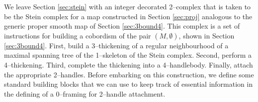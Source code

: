 We leave Section \ref{sec:stein} with an integer decorated 2--complex that is taken to be the Stein complex for a map constructed in Section \ref{sec:proj} analogous to the generic proper smooth map of Section \ref{sec:3bound4}.
This complex is a set of instructions for building a cobordism of the pair $(M,\emptyset)$, shown in Section \ref{sec:3bound4}.
First, build a 3--thickening of a regular neighbourhood of a maximal spanning tree of the 1--skeleton of the Stein complex.
Second, perform a 4--thickening.
Third, complete the thickening into a 4--handlebody.
Finally, attach the appropriate 2--handles.
Before embarking on this construction, we define some standard building blocks that we can use to keep track of essential information in the defining of a 0--framing for 2--handle attachment.
